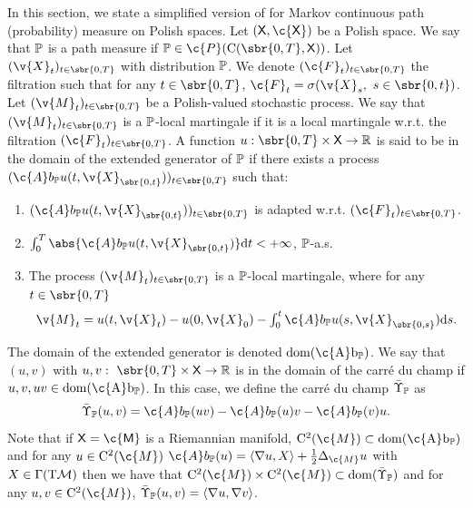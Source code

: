 In this section, we state a simplified version of \textcite[Theorem 3.17]{cattiaux2021time} for Markov continuous path (probability) measure on Polish spaces.
Let $(\sf{X}, \c{X})$ be a Polish space.
We say that $\bb{P}$ is a path measure if $\bb{P} \in \c{P}(\mathrm{C}(\sbr{0,T}, \sf{X}))$.
Let $(\v{X}_t)_{t \in \sbr{0,T}}$ with distribution $\bb{P}$.
We denote $(\c{F}_t)_{t \in \sbr{0,T}}$ the filtration such that for any $t \in \sbr{0,T}$, $\c{F}_t = \sigma(\v{X}_s, \ s \in \sbr{0,t})$.
Let $(\v{M}_t)_{t \in \sbr{0,T}}$ be a Polish-valued stochastic process.
We say that $(\v{M}_t)_{t \in \sbr{0,T}}$ is a $\bb{P}$-local martingale if it is a local martingale w.r.t.
the filtration $(\c{F}_t)_{t \in \sbr{0,T}}$.
A function $u: \sbr{0,T} \times \sf{X} \to \R$ is said to be in the domain of the extended generator of $\bb{P}$ if there exists a process $(\c{A} b_{\bb{P}} u(t, \v{X}_{\sbr{0,t}}))_{t \in \sbr{0,T}}$ such that: \begin{enumerate}[label= (\alph*), wide, labelindent=0pt] \item $(\c{A}b_{\bb{P}} u(t, \v{X}_{\sbr{0,t}}))_{t \in \sbr{0,T}}$ is adapted w.r.t.
	      $(\c{F}_t)_{t \in \sbr{0,T}}$.
	\item $\int_0^T \abs{\c{A}b_{\bb{P}} u(t, \v{X}_{\sbr{0,t}})} \mathrm{d} t < +\infty$, $\bb{P}$-a.s.
	\item The process $(\v{M}_t)_{t \in \sbr{0,T}}$ is a $\bb{P}$-local martingale,
	      where for any $t \in \sbr{0,T}$
	      \begin{equation}
		      \textstyle{\v{M}_t = u(t,\v{X}_t) - u(0, \v{X}_0) - \int_0^t \c{A}b_{\bb{P}} u(s, \v{X}_{\sbr{0,s}}) \mathrm{d} s   .}
	      \end{equation}
\end{enumerate}
The domain of the extended generator is denoted $\rm{dom}(\c{A}b_{\bb{P}})$.
We say that $(u,v)$ with $u,v : \ \sbr{0,T} \times \sf{X} \to \R$ is in the domain of the carr\'e du champ if $u,v, uv \in \rm{dom}(\c{A}b_{\bb{P}})$.
In this case, we define the carr\'e du champ $\bar{\carrechamp}_{\bb{P}}$ as \begin{equation} \bar{\carrechamp}_{\bb{P}}(u,v) = \c{A}b_{\bb{P}}(uv) - \c{A}b_{\bb{P}}(u)v - \c{A}b_{\bb{P}}(v)u .
\end{equation}
Note that if $\sf{X} = \c{M}$ is a Riemannian manifold, $\mathrm{C}^2(\c{M}) \subset \rm{dom}(\c{A}b_{\bb{P}})$ and for any $u \in \mathrm{C}^2(\c{M})$ $\c{A}b_{\bb{P}}(u) = \langle \nabla u, X \rangle + \tfrac{1}{2}\Delta_\c{M} u$ with $X \in \Gamma(\mathrm{T}\mathcal{M})$ then we have that $\mathrm{C}^2(\c{M}) \times \mathrm{C}^2(\c{M}) \subset \rm{dom}(\bar{\carrechamp}_{\bb{P}})$ and for any $u, v \in \mathrm{C}^2(\c{M})$, $\bar{\carrechamp}_{\bb{P}}(u,v) = \langle \nabla u, \nabla v \rangle$.
